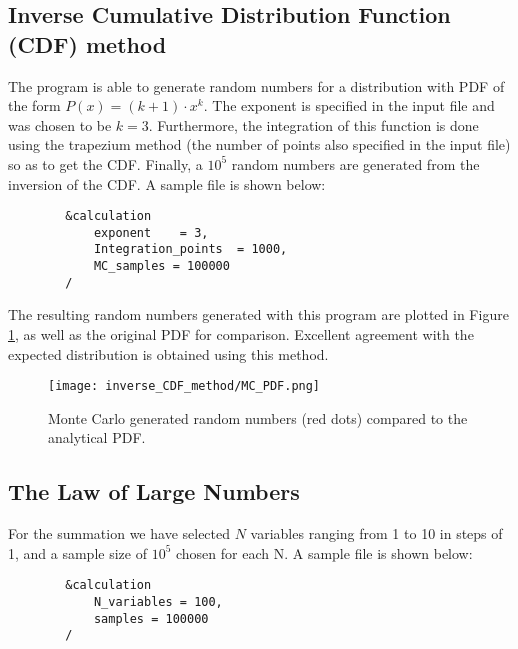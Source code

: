 \subsection{Inverse Cumulative Distribution Function (CDF) method}
\label{subection:inverse_CDF}

The program is able to generate random numbers for a distribution with PDF of the form $P(x) = (k+1)\cdot x^k$. The exponent is specified in the input file and was chosen to be $k = 3$. Furthermore, the integration of this function is done using the trapezium method (the number of points also specified in the input file) so as to get the CDF. Finally, a $10^5$ random numbers are generated from the inversion of the CDF. A sample  file is shown below:

    \begin{tcolorbox}[
        boxrule=0pt,
        sharp corners
    ]
        \begin{lstlisting}
        &calculation
            exponent    = 3,
            Integration_points  = 1000,
            MC_samples = 100000
        /
        \end{lstlisting}
    \end{tcolorbox}

    The resulting random numbers generated with this program are plotted in Figure \ref{fig:inverse_CDF}, as well as the original PDF for comparison. Excellent agreement with the expected distribution is obtained using this method.

    \begin{figure}[H]
        \centering
        \texttt{[image: inverse\_CDF\_method/MC\_PDF.png]}
        \caption{Monte Carlo generated random numbers (red dots) compared to the analytical PDF.}
        \label{fig:inverse_CDF}
    \end{figure}

\subsection{The Law of Large Numbers}
\label{subection:law_of_large_numbers}

For the summation we have selected $N$ variables ranging from 1 to 10 in steps of 1, and a sample size of $10^5$ chosen for each N. A sample  file is shown below:

    \begin{tcolorbox}[
        boxrule=0pt,
        sharp corners
    ]
        \begin{lstlisting}
        &calculation
            N_variables = 100,
            samples = 100000
        /
        \end{lstlisting}
    \end{tcolorbox}

